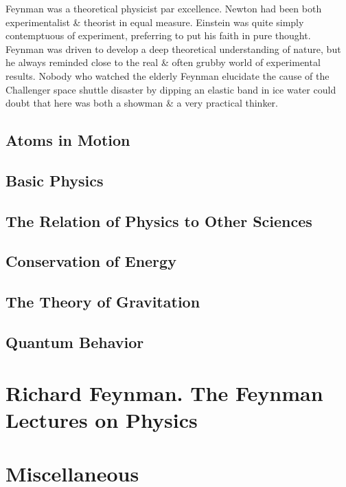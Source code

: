 \documentclass{article}
\begin{document}
{\sc Feynman} was a theoretical physicist par excellence. {\sc Newton} had been both experimentalist \& theorist in equal measure. {\sc Einstein} was quite simply contemptuous of experiment, preferring to put his faith in pure thought. {\sc Feynman} was driven to develop a deep theoretical understanding of nature, but he always reminded close to the real \& often grubby world of experimental results. Nobody who watched the elderly {\sc Feynman} elucidate the cause of the Challenger space shuttle disaster by dipping an elastic band in ice water could doubt that here was both a showman \& a very practical thinker.

\subsection{Atoms in Motion}

\subsection{Basic Physics}

\subsection{The Relation of Physics to Other Sciences}

\subsection{Conservation of Energy}

\subsection{The Theory of Gravitation}

\subsection{Quantum Behavior}


\section{{\sc Richard Feynman}. The Feynman Lectures on Physics}


\section{Miscellaneous}


\printbibliography[heading=bibintoc]
	
\end{document}
